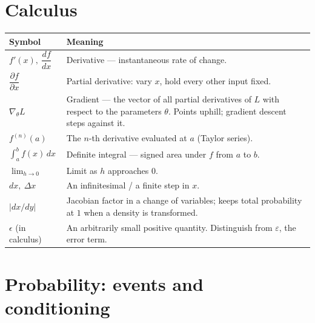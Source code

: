 \documentclass[10pt,letterpaper,onecolumn]{article}
\makeatletter
\newenvironment{symtab}
  {\begin{longtable}{@{}>{\raggedright\arraybackslash}p{0.26\textwidth}%
                       >{\raggedright\arraybackslash}p{0.70\textwidth}@{}}
   \toprule
   \textbf{Symbol} & \textbf{Meaning} \\
   \midrule
   \endhead
   \bottomrule
   \endfoot}
  {\end{longtable}}
\makeatother
\begin{document}
\section{Calculus}

\begin{symtab}
$f'(x),\ \dfrac{df}{dx}$ & Derivative — instantaneous rate of change. \\
$\dfrac{\partial f}{\partial x}$ & Partial derivative: vary $x$, hold every other input fixed. \\
$\nabla_\theta L$ & Gradient — the vector of all partial derivatives of $L$ with respect to the parameters $\theta$. Points uphill; gradient descent steps against it. \\
$f^{(n)}(a)$ & The $n$-th derivative evaluated at $a$ (Taylor series). \\
$\displaystyle\int_a^b f(x)\,dx$ & Definite integral — signed area under $f$ from $a$ to $b$. \\
$\lim_{h\to 0}$ & Limit as $h$ approaches $0$. \\
$dx,\ \Delta x$ & An infinitesimal / a finite step in $x$. \\
$|dx/dy|$ & Jacobian factor in a change of variables; keeps total probability at $1$ when a density is transformed. \\
$\epsilon$ (in calculus) & An arbitrarily small positive quantity. Distinguish from $\varepsilon$, the error term. \\
\end{symtab}

\section{Probability: events and conditioning}
\label{sec:events}
\end{document}
